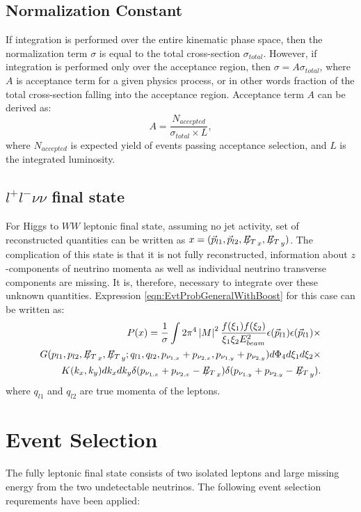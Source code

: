 \documentclass{cmspaper}
\newcommand{\met}{\mbox{$E_T\hspace{-1.1em}/$\hspace{0.7em}}}
\begin{document}
\subsection{Normalization Constant}
If integration is performed over the entire kinematic phase space, then the normalization term $\sigma$ is equal to the total cross-section $\sigma_{total}$. However, if integration is performed only over the acceptance region, then $\sigma=A\sigma_{total}$, where $A$ is acceptance term for a given physics process, or in other words fraction of the total cross-section falling into the acceptance region. Acceptance term $A$ can be derived as:
\begin{equation}
A=\frac{N_{accepted}}{\sigma_{total}\times L},
\label{eqn:Acceptance}  
\end{equation}
where $N_{accepted}$ is expected yield of events passing acceptance selection, and $L$ is the integrated luminosity.

\subsection{$l^{+}l^{-}\nu\nu$ final state }
For Higgs to $WW$ leptonic final state, assuming no jet activity, 
set of reconstructed quantities can be written as $x=(\vec{p}_{l1},\vec{p}_{l2}, \met_{x},  \met_{y})$.
The complication of this state is that it is not fully reconstructed, information about $z$-components of neutrino 
momenta as well as individual neutrino transverse components are missing. It is, therefore, necessary to integrate over these 
unknown quantities. Expression \ref{eqn:EvtProbGeneralWithBoost} for this case can be written as:
\begin{eqnarray}
P(x)=\frac{1}{\sigma }\int 2 \pi^{4} \left| M \right|^{2} \frac{f(\xi_{1})f(\xi_{2})}{\xi_{1}\xi_{2}E_{beam}^{2}}
\epsilon(\vec{p}_{l1})\epsilon(\vec{p}_{l1}) \times \nonumber \\ 
                         G(p_{l1},p_{l2}, \met_{x},  \met_{y}; q_{l1}, q_{l2}, p_{\nu_{1,x}}+  p_{\nu_{2,x}}, p_{\nu_{1,y}}+p_{\nu_{2,y}})d\Phi_{4}d\xi_{1}d\xi_{2} \times \nonumber \\
                         K(k_{x},k_{y})dk_{x}dk_{y}\delta(p_{\nu_{1,x}}+p_{\nu_{2,x}}-\met_{x})\delta(p_{\nu_{1,y}}+p_{\nu_{2,y}}-\met_{y}).
\label{eqn:EvtProbGeneralWithBoost2L2nu}  
\end{eqnarray}
where $q_{l1}$ and $q_{l2}$ are true momenta of the leptons.

\section{Event Selection}
The fully leptonic final state consists of two isolated leptons and large missing energy from the two undetectable neutrinos. 
The following event selection requrements have been applied:
\end{document}
